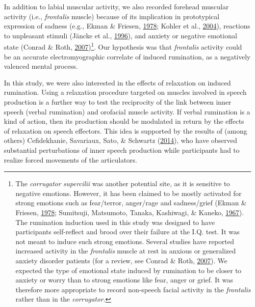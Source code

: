 \documentclass[a4paper,12pt,twoside,openright,oldfontcommands]{memoir}
\let\rmarkdownfootnote\footnote%
\def\footnote{\protect\rmarkdownfootnote}
\begin{document}
In addition to labial muscular activity, we also recorded forehead muscular activity (i.e., \emph{frontalis} muscle) because of its implication in prototypical expression of sadness (e.g., Ekman \& Friesen, \protect\hyperlink{ref-ekman_facial_1978}{1978}; Kohler et al., \protect\hyperlink{ref-kohler_differences_2004}{2004}), reactions to unpleasant stimuli (Jäncke et al., \protect\hyperlink{ref-Jancke1996}{1996}), and anxiety or negative emotional state (Conrad \& Roth, \protect\hyperlink{ref-conrad_muscle_2007}{2007})\footnote{The \emph{corrugator supercilii} was another potential site, as it is sensitive to negative emotions. However, it has been claimed to be mostly activated for strong emotions such as fear/terror, anger/rage and sadness/grief (Ekman \& Friesen, \protect\hyperlink{ref-ekman_facial_1978}{1978}; Sumitsuji, Matsumoto, Tanaka, Kashiwagi, \& Kaneko, \protect\hyperlink{ref-sumitsuji_electromyographic_1967}{1967}). The rumination induction used in this study was designed to have participants self-reflect and brood over their failure at the I.Q. test. It was not meant to induce such strong emotions. Several studies have reported increased activity in the \emph{frontalis} muscle at rest in anxious or generalized anxiety disorder patients (for a review, see Conrad \& Roth, \protect\hyperlink{ref-conrad_muscle_2007}{2007}). We expected the type of emotional state induced by rumination to be closer to anxiety or worry than to strong emotions like fear, anger or grief. It was therefore more appropriate to record non-speech facial activity in the \emph{frontalis} rather than in the \emph{corrugator.}}. Our hypothesis was that \emph{frontalis} activity could be an accurate electromyographic correlate of induced rumination, as a negatively valenced mental process.

In this study, we were also interested in the effects of relaxation on induced rumination. Using a relaxation procedure targeted on muscles involved in speech production is a further way to test the reciprocity of the link between inner speech (verbal rumination) and orofacial muscle activity. If verbal rumination is a kind of action, then its production should be modulated in return by the effects of relaxation on speech effectors. This idea is supported by the results of (among others) Cefidekhanie, Savariaux, Sato, \& Schwartz (\protect\hyperlink{ref-cefidekhanie_interaction_2014}{2014}), who have observed substantial perturbations of inner speech production while participants had to realize forced movements of the articulators.
\end{document}
